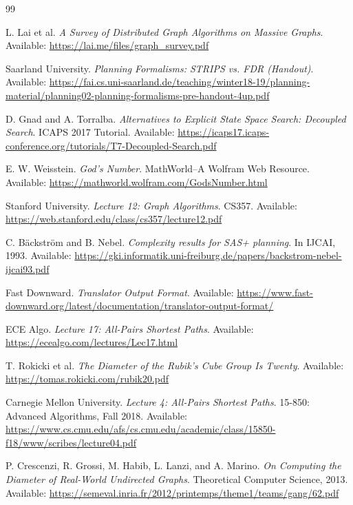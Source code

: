 \documentclass[12pt,a4paper]{report}
\begin{document}
\begin{thebibliography}{99}

L. Lai et al. \emph{A Survey of Distributed Graph Algorithms on Massive Graphs}. Available: \url{https://lai.me/files/graph_survey.pdf}

Saarland University. \emph{Planning Formalisms: STRIPS vs. FDR (Handout)}. Available: \url{https://fai.cs.uni-saarland.de/teaching/winter18-19/planning-material/planning02-planning-formalisms-pre-handout-4up.pdf}

D. Gnad and A. Torralba. \emph{Alternatives to Explicit State Space Search: Decoupled Search}. ICAPS 2017 Tutorial. Available: \url{https://icaps17.icaps-conference.org/tutorials/T7-Decoupled-Search.pdf}

E. W. Weisstein. \emph{God's Number}. MathWorld--A Wolfram Web Resource. Available: \url{https://mathworld.wolfram.com/GodsNumber.html}

Stanford University. \emph{Lecture 12: Graph Algorithms}. CS357. Available: \url{https://web.stanford.edu/class/cs357/lecture12.pdf}

C. Bäckström and B. Nebel. \emph{Complexity results for SAS+ planning}. In IJCAI, 1993. Available: \url{https://gki.informatik.uni-freiburg.de/papers/backstrom-nebel-ijcai93.pdf}

Fast Downward. \emph{Translator Output Format}. Available: \url{https://www.fast-downward.org/latest/documentation/translator-output-format/}

ECE Algo. \emph{Lecture 17: All-Pairs Shortest Paths}. Available: \url{https://ecealgo.com/lectures/Lec17.html}

T. Rokicki et al. \emph{The Diameter of the Rubik's Cube Group Is Twenty}. Available: \url{https://tomas.rokicki.com/rubik20.pdf}

Carnegie Mellon University. \emph{Lecture 4: All-Pairs Shortest Paths}. 15-850: Advanced Algorithms, Fall 2018. Available: \url{https://www.cs.cmu.edu/afs/cs.cmu.edu/academic/class/15850-f18/www/scribes/lecture04.pdf}

P. Crescenzi, R. Grossi, M. Habib, L. Lanzi, and A. Marino. \emph{On Computing the Diameter of Real-World Undirected Graphs}. Theoretical Computer Science, 2013. Available: \url{https://semeval.inria.fr/2012/printemps/theme1/teams/gang/62.pdf}


\end{thebibliography}
\end{document}
